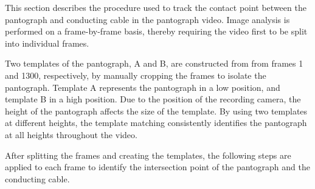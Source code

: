 This section describes the procedure used to track the contact point between the pantograph and conducting cable in the pantograph video. Image analysis is performed on a frame-by-frame basis, thereby requiring the video first to be split into individual frames.

Two templates of the pantograph, A and B, are constructed from from frames 1 and 1300, respectively, by manually cropping the frames to isolate the pantograph. Template A represents the pantograph in a low position, and template B in a high position. Due to the position of the recording camera, the height of the pantograph affects the size of the template. By using two templates at different heights, the template matching consistently identifies the pantograph at all heights throughout the video.

After splitting the frames and creating the templates, the following steps are applied to each frame to identify the intersection point of the pantograph and the conducting cable.
